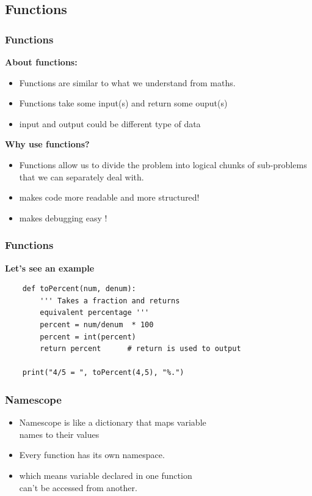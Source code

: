\documentclass[12pt, aspectratio=169]{beamer}
\begin{document}
 \subsection{Functions}
 \begin{frame}[fragile]
   \frametitle{Functions}
\textbf{About functions:}
   \begin{itemize}
   \item Functions are similar to what we understand from maths.
   \pause
   \item Functions take some input(s) and return some ouput(s)
   \pause
   \item input and output could be different type of data
   \end{itemize}
   \pause
\textbf{Why use functions?}
   \pause
\begin{itemize}
   \item Functions allow us to divide the problem into logical chunks of
     sub-problems that we can separately deal with.
   \pause
   \item makes code more readable and more structured!
   \pause
   \item makes debugging easy !
\end{itemize}
\end{frame}


 \begin{frame}
   \frametitle{Functions}
\textbf{Let's see an example}
\vspace{2em}
\begin{verbatim}
    def toPercent(num, denum):
        ''' Takes a fraction and returns 
        equivalent percentage '''
        percent = num/denum  * 100
        percent = int(percent)  
        return percent      # return is used to output

    print("4/5 = ", toPercent(4,5), "%.")

\end{verbatim}
 \end{frame}


 \begin{frame}[fragile]
   \frametitle{Namescope}
   \begin{itemize}
   \item Namescope is like a dictionary that maps variable \\
     names to their values 
   \item Every function has its own namespace.
   \item which means variable declared in one function \\
     can't be accessed from another.
   \end{itemize}
 \end{frame}
\end{document}

